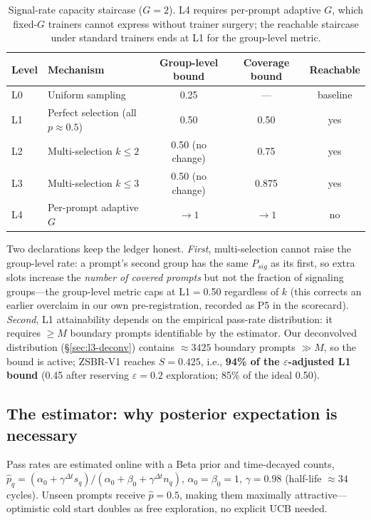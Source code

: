 \documentclass[11pt]{article}
\theoremstyle{definition}
\begin{document}
\begin{table}[t]
\centering\small
\caption{Signal-rate capacity staircase ($G{=}2$). L4 requires per-prompt adaptive
$G$, which fixed-$G$ trainers cannot express without trainer surgery; the reachable
staircase under standard trainers ends at L1 for the group-level metric.}
\label{tab:staircase}
\begin{tabular}{@{}llccc@{}}
\toprule
Level & Mechanism & Group-level bound & Coverage bound & Reachable \\
\midrule
L0 & Uniform sampling & 0.25 & --- & baseline \\
L1 & Perfect selection (all $p{\approx}0.5$) & 0.50 & 0.50 & yes \\
L2 & Multi-selection $k{\le}2$ & 0.50 (no change) & 0.75 & yes \\
L3 & Multi-selection $k{\le}3$ & 0.50 (no change) & 0.875 & yes \\
L4 & Per-prompt adaptive $G$ & $\to1$ & $\to1$ & no \\
\bottomrule
\end{tabular}
\end{table}

Two declarations keep the ledger honest. \emph{First}, multi-selection cannot raise
the group-level rate: a prompt's second group has the same $P_{sig}$ as its first,
so extra slots increase the \emph{number of covered prompts} but not the fraction
of signaling groups---the group-level metric caps at L1$=$0.50 regardless of $k$
(this corrects an earlier overclaim in our own pre-registration, recorded as P5 in
the scorecard). \emph{Second}, L1 attainability depends on the empirical pass-rate
distribution: it requires $\ge M$ boundary prompts identifiable by the estimator.
Our deconvolved distribution (\S\ref{sec:l3-deconv}) contains ${\approx}3425$
boundary prompts $\gg M$, so the bound is active; ZSBR-V1 reaches $S{=}0.425$,
i.e., \textbf{94\% of the $\varepsilon$-adjusted L1 bound} (0.45 after reserving
$\varepsilon{=}0.2$ exploration; 85\% of the ideal 0.50).

\subsection{The estimator: why posterior expectation is necessary}\label{sec:l2-est}
Pass rates are estimated online with a Beta prior and time-decayed counts,
$\hat p_q = (\alpha_0+\gamma^{\Delta t}s_q)/(\alpha_0+\beta_0+\gamma^{\Delta
t}n_q)$, $\alpha_0{=}\beta_0{=}1$, $\gamma{=}0.98$ (half-life ${\approx}34$
cycles). Unseen prompts receive $\hat p{=}0.5$, making them maximally
attractive---optimistic cold start doubles as free exploration, no explicit UCB
needed.
\end{document}
